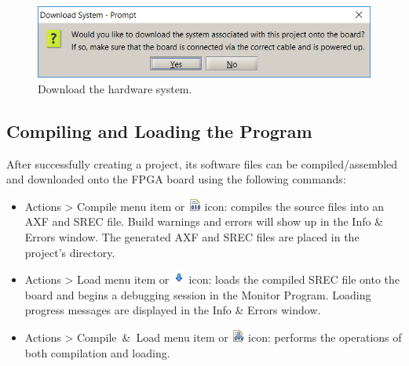 \documentclass[11pt, twoside, pdftex]{article}
\begin{document}
\begin{enumerate}
\begin{figure}[H]
   \begin{center}
      \includegraphics[scale=1]{screenshots/figure11.png}
   \end{center}
   \caption{Download the hardware system.}
	 \label{fig:11}
\end{figure}

\end{enumerate}


\subsection{Compiling and Loading the Program}
\label{sec:3.2}

After successfully creating a project, its software files can be compiled/assembled and downloaded onto the FPGA board using the
following commands:

\begin{itemize}
\item \textsf{Actions > Compile} menu item or 
\includegraphics{toolbar/compile.png} icon: compiles the source
files into an AXF and SREC file. Build warnings and errors
will show up in the \textsf{Info \& Errors} window.
The generated AXF and SREC files are placed in the project's directory.

\item \textsf{Actions > Load} menu item or \includegraphics{toolbar/load.png} icon:
loads the compiled SREC file onto the board and begins a debugging session in the 
Monitor Program. Loading progress messages are displayed in the \textsf{Info \& Errors} window.

\item \textsf{Actions > Compile~\&~Load} menu item or \includegraphics{toolbar/compile_load.png}
icon: performs the operations of both compilation and loading.
\end{itemize}
\end{document}
